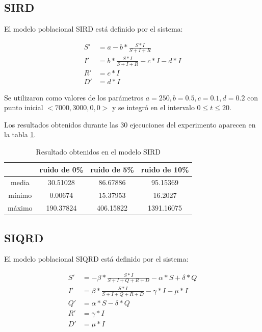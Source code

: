 \subsection{SIRD}

El modelo poblacional SIRD está definido por el sistema:

\begin{align*}
    S' & = a - b * \frac{S * I}{S + I + R}             \\
    I' & = b * \frac{S * I}{S + I + R} - c * I - d * I \\
    R' & = c * I                                       \\
    D' & = d * I
\end{align*}

Se utilizaron como valores de los parámetros $a = 250, b = 0.5, c = 0.1, d = 0.2$ con punto inicial $<7000, 3000, 0, 0>$ y se integró en el intervalo $0 \leq t \leq 20$.

Los resultados obtenidos durante las 30 ejecuciones del experimento aparecen en la tabla \ref{table:experiment_SIRD}.

\begin{table}[!h]
    \centering
    \caption{Resultado obtenidos en el modelo SIRD}
    \begin{tabular}{|c|c|c|c|}
        \hline
               & \textbf{ruido de 0\%} & \textbf{ruido de 5\%} & \textbf{ruido de 10\%} \\
        \hline
        media  & 30.51028              & 86.67886              & 95.15369               \\
        \hline
        mínimo & 0.00674               & 15.37953              & 16.2027                \\
        \hline
        máximo & 190.37824             & 406.15822             & 1391.16075             \\
        \hline
    \end{tabular}
    \label{table:experiment_SIRD}
\end{table}

\subsection{SIQRD}

El modelo poblacional SIQRD está definido por el sistema:

\begin{align*}
    S' & = -\beta * \frac{S * I}{S + I + Q + R + D} - \alpha * S + \delta * Q \\
    I' & = \beta * \frac{S * I}{S + I + Q + R + D} - \gamma * I - \mu * I     \\
    Q' & = \alpha * S - \delta * Q                                            \\
    R' & = \gamma * I                                                         \\
    D' & = \mu * I
\end{align*}

